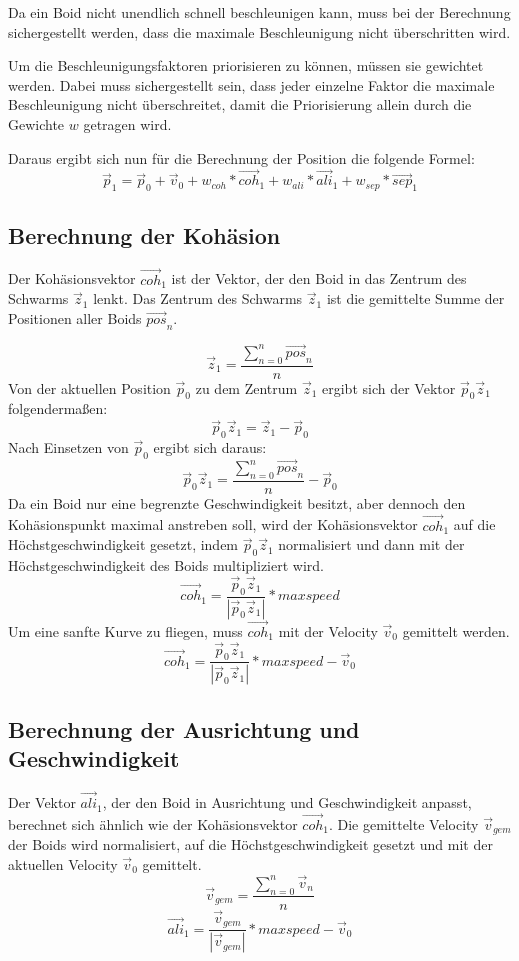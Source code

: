 \documentclass[draft=false
              ,paper=a4
              ,twoside=false
              ,fontsize=11pt
              ,headsepline
              ,BCOR10mm
              ,DIV11
              ,bibtotoc
              ,liststotoc
              ]{scrbook}
\begin{document}
Da ein Boid nicht unendlich schnell beschleunigen kann, muss bei der Berechnung sichergestellt werden, dass die maximale Beschleunigung nicht überschritten wird.

Um die Beschleunigungsfaktoren priorisieren zu können, müssen sie gewichtet werden. Dabei muss sichergestellt sein, dass jeder einzelne Faktor die maximale Beschleunigung nicht überschreitet, damit die Priorisierung allein durch die Gewichte \(w\) getragen wird.

Daraus ergibt sich nun für die Berechnung der Position die folgende Formel:
\[\vec{p}_1 = \vec{p}_0 + \vec{v}_0 + w_{coh} * \vec{coh}_1 + w_{ali} * \vec{ali}_1 + w_{sep} * \vec{sep}_1\]

\subsection{Berechnung der Kohäsion}
Der Kohäsionsvektor \(\vec{coh}_1\) ist der Vektor, der den Boid in das Zentrum des Schwarms \(\vec{z}_1\) lenkt. Das Zentrum des Schwarms \(\vec{z}_1\) ist die gemittelte Summe der Positionen aller Boids \(\vec{pos}_n\).

\[\vec{z}_1 = \frac{\sum \limits_{n=0}^n \vec{pos}_n}{n} \]
Von der aktuellen Position \(\vec{p}_0\) zu dem Zentrum \(\vec{z}_1\) ergibt sich der Vektor \(\vec{p}_0\vec{z}_1\) folgendermaßen:
\[\vec{p}_0\vec{z}_1 = \vec{z}_1 - \vec{p}_0\]
Nach Einsetzen von \(\vec{p}_0\) ergibt sich daraus:
\[\vec{p}_0\vec{z}_1 = \frac{\sum \limits_{n=0}^n \vec{pos}_n}{n} - \vec{p}_0\]
Da ein Boid nur eine begrenzte Geschwindigkeit besitzt, aber dennoch den Kohäsionspunkt maximal anstreben soll, wird der Kohäsionsvektor \(\vec{coh}_1\) auf die Höchstgeschwindigkeit gesetzt, indem \(\vec{p}_0\vec{z}_1\) normalisiert und dann mit der Höchstgeschwindigkeit des Boids multipliziert wird.
\[\vec{coh}_1 = \frac{\vec{p}_0\vec{z}_1}{|\vec{p}_0\vec{z}_1|} * maxspeed\]
Um eine sanfte Kurve zu fliegen, muss \(\vec{coh}_1\) mit der Velocity \(\vec{v}_0\) gemittelt werden.
\[\vec{coh}_1 = \frac{\vec{p}_0\vec{z}_1}{|\vec{p}_0\vec{z}_1|} * maxspeed - \vec{v}_0\]

\subsection{Berechnung der Ausrichtung und Geschwindigkeit}
Der Vektor \(\vec{ali}_1\), der den Boid in Ausrichtung und Geschwindigkeit anpasst, berechnet sich ähnlich wie der Kohäsionsvektor \(\vec{coh}_1\). Die gemittelte Velocity \(\vec{v}_{gem}\) der Boids wird normalisiert, auf die Höchstgeschwindigkeit gesetzt und mit der aktuellen Velocity \(\vec{v}_0\) gemittelt.
\[\vec{v}_{gem} = \frac{\sum \limits_{n=0}^n \vec{v}_n}{n}\]
\[\vec{ali}_1 = \frac{\vec{v}_{gem}}{|\vec{v}_{gem}|} * maxspeed - \vec{v}_0\]
\end{document}
